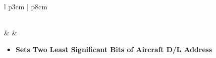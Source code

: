 \documentclass[8pt,usenames,dvipsnames,twoside]{article}
\begin{document}
\begin{center}
\begin{longtable}{l p{3cm} | p{8cm}}
\begin{minipage}[t]{\linewidth}
\begin{itemize}
\begin{itemize}
					\end{itemize}
				\end{itemize}
			\end{minipage} \\
			\midrule
			\textbullet &  &
			\begin{minipage}[t]{\linewidth}
				\vspace{-7pt}
				\begin{itemize}
					\item \textbf{Sets Two Least Significant Bits of Aircraft D/L Address}
				\end{itemize}
			\end{minipage} \\
			\bottomrule
		\end{longtable}
	\end{center}

	\clearpage
\end{document}
